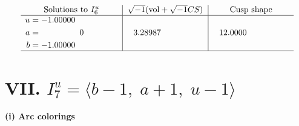 \documentclass[1p]{elsarticle_modified}
\theoremstyle{definition}
\newcommand{\I}{\sqrt{-1}}
\begin{document}
$$\begin{array}{c|c|c}  
\text{Solutions to }I^u_{6}& \I (\text{vol} + \sqrt{-1}CS) & \text{Cusp shape}\\
 \hline 
\begin{aligned}
u &= -1.00000\phantom{ +0.000000I} \\
a &= \phantom{-0.000000 } 0 \\
b &= -1.00000\phantom{ +0.000000I}\end{aligned}
 & \phantom{-}3.28987\phantom{ +0.000000I} & \phantom{-}12.0000\phantom{ +0.000000I}\\
 \hline 
 \end{array}$$\newpage\newpage\renewcommand{\arraystretch}{1}
\centering \section*{VII. $I^u_{7}= \langle b-1,\;a+1,\;u-1 \rangle$}
\flushleft \textbf{(i) Arc colorings}\\
\end{document}
